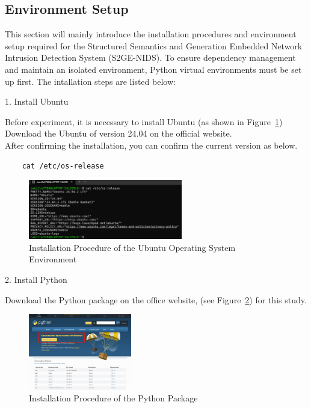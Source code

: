 \begin{ZhChapter}
    \newpage
    \subsection{Environment Setup}
    This section will mainly introduce the installation procedures and environment setup required for the Structured Semantics and Generation Embedded Network Intrusion Detection System (S2GE-NIDS). To ensure dependency management and maintain an isolated environment, Python virtual environments must be set up first. The intallation steps are listed below:

    1. Install Ubuntu

    Before experiment,  it is necessary to install Ubuntu (as shown in Figure~\ref{fig:Ubuntu}) Download the Ubuntu of version 24.04 on the official website.\\

    After confirming the installation, you can confirm the current version as below.

    \begin{verbatim}
    cat /etc/os-release
    \end{verbatim}
    \begin{figure}[htbp]
        \centering
        \includegraphics[width = 0.6\textwidth]{image/Ubuntu.jpg}
        \caption{Installation Procedure of the Ubuntu Operating System Environment}
        \label{fig:Ubuntu}
    \end{figure}

    2. Install Python

    Download the Python package on the office website, (see Figure~\ref{fig:Python}) for this study.

    \begin{figure}[htbp]
        \centering
        \includegraphics[width = 0.4\textwidth]{image/python.jpg}
        \caption{Installation Procedure of the Python Package}
        \label{fig:Python}
    \end{figure}


\end{ZhChapter}

